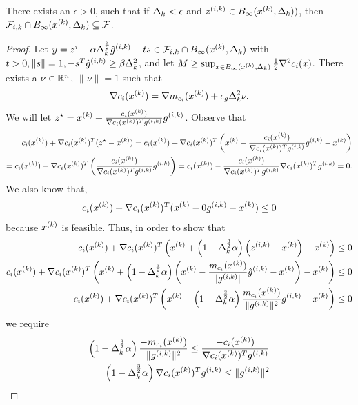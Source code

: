 \begin{theorem}
There exists an $\epsilon > 0$, such that if $\Delta_k < \epsilon$ and $z^{(i, k)} \in B_{\infty}({x^{(k)}}, \Delta_k))$,
then ${\mathcal F_{i, k}} \cap B_{\infty}({x^{(k)}}, \Delta_k) \subseteq {\mathcal F}$.

\end{theorem}

\begin{proof}
Let $y = z^i - \alpha \Delta_k^{\frac 3 2}{{\hat g}^{(i, k)}} + t s \in {\mathcal F_{i, k}} \cap B_{\infty}({x^{(k)}}, \Delta_k) $ with $t > 0, \|s\| = 1, -s^T{{\hat g}^{(i, k)}} \ge \beta \Delta_k^2$, and let $M \ge \sup_{x \in B_{\infty}({x^{(k)}}, \Delta_k)} \frac 1 2 \nabla^2 c_i(x)$.
There exists a $\nu \in {\mathbb R^{n}}$, $\|\nu\|=1$ such that 
\begin{align*}
\nabla c_i({x^{(k)}}) = \nabla m_{c_i}({x^{(k)}}) + \epsilon_{g}\Delta_k^2\nu.
\end{align*}
We will let $z^{\star} = {x^{(k)}} + \frac{c_i({x^{(k)}})}{\nabla c_i({x^{(k)}}) ^T {g^{(i, k)}}}{g^{(i, k)}}$.
Observe that
\begin{align*}
c_i({x^{(k)}}) + \nabla c_i({x^{(k)}})^T (z^{\star} - {x^{(k)}}) = c_i({x^{(k)}}) + \nabla c_i({x^{(k)}})^T\left( {x^{(k)}} - \frac{c_i({x^{(k)}})}{\nabla c_i({x^{(k)}}) ^T {g^{(i, k)}}}{g^{(i, k)}} - {x^{(k)}}\right) \\
= c_i({x^{(k)}}) - \nabla c_i({x^{(k)}})^T\left(\frac{c_i({x^{(k)}})}{\nabla c_i({x^{(k)}}) ^T {g^{(i, k)}}}{g^{(i, k)}}\right) = c_i({x^{(k)}}) - \frac{c_i({x^{(k)}})}{\nabla c_i({x^{(k)}}) ^T {g^{(i, k)}}}\nabla c_i({x^{(k)}})^T{g^{(i, k)}} = 0. \\
\end{align*}
We also know that,
\begin{align*}
c_i({x^{(k)}}) + \nabla c_i({x^{(k)}})^T ({x^{(k)}} - 0 {g^{(i, k)}} -{x^{(k)}}) \le 0
\end{align*}
because ${x^{(k)}}$ is feasible.
Thus, in order to show that 
\begin{align*}
c_i({x^{(k)}}) + \nabla c_i({x^{(k)}})^T\left({x^{(k)}} + \left(1 - \Delta_k^{\frac 3 2 }\alpha\right)\left({z^{(i, k)}} - {x^{(k)}}\right) - {x^{(k)}}\right) \le 0 \\
c_i({x^{(k)}}) + \nabla c_i({x^{(k)}})^T\left({x^{(k)}} + \left(1 - \Delta_k^{\frac 3 2 }\alpha\right)\left({x^{(k)}} - \frac{m_{c_i}({x^{(k)}})}{\|{g^{(i, k)}}\|}{{\hat g}^{(i, k)}} - {x^{(k)}}\right) - {x^{(k)}}\right) \le 0 \\
c_i({x^{(k)}}) + \nabla c_i({x^{(k)}})^T\left({x^{(k)}} - \left(1 - \Delta_k^{\frac 3 2 }\alpha\right)\frac{m_{c_i}({x^{(k)}})}{\|{g^{(i, k)}}\|^2}{g^{(i, k)}} - {x^{(k)}}\right) \le 0
\end{align*}
we require
\begin{align*}
\left(1 - \dk^{\frac 3 2 }\alpha\right)\frac{-m_{c_i}(\xk)}{\|\gik\|^2} \le \frac{-c_i(\xk)}{\nabla c_i(\xk) ^T \gik} \\
\left(1 - \dk^{\frac 3 2 }\alpha\right)\nabla c_i(\xk) ^T \gik \le \|\gik\|^2  \\

\end{align*}
\end{proof}
